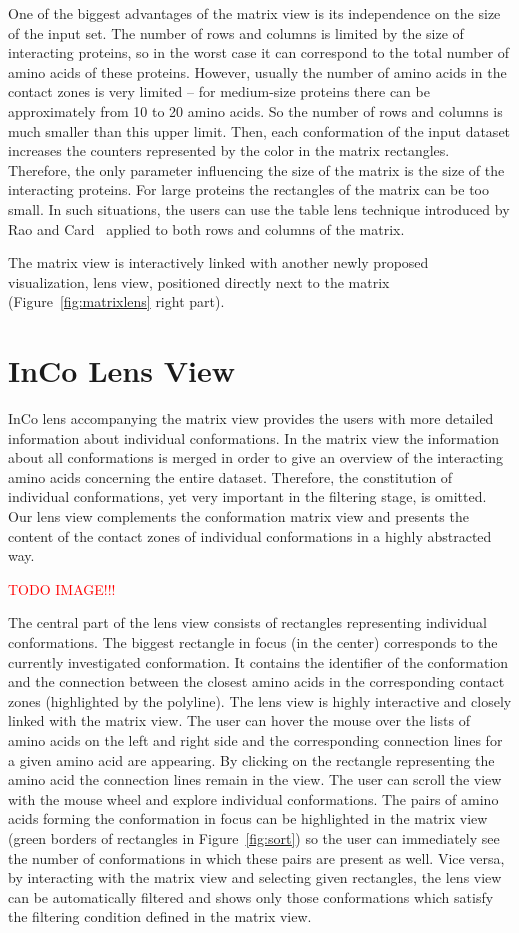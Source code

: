 \documentclass[journal]{vgtc}                %
\begin{document}
One of the biggest advantages of the matrix view is its independence on the size of the input set.
The number of rows and columns is limited by the size of interacting proteins, so in the worst case it can correspond to the total number of amino acids of these proteins.
However, usually the number of amino acids in the contact zones is very limited -- for medium-size proteins there can be approximately from 10 to 20 amino acids.
So the number of rows and columns is much smaller than this upper limit.
Then, each conformation of the input dataset increases the counters represented by the color in the matrix rectangles.
Therefore, the only parameter influencing the size of the matrix is the size of the interacting proteins.
For large proteins the rectangles of the matrix can be too small.
In such situations, the users can use the table lens technique introduced by Rao and Card~\cite{Rao1994} applied to both rows and columns of the matrix.

The matrix view is interactively linked with another newly proposed visualization, lens view, positioned directly next to the matrix (Figure~\ref{fig:matrixlens} right part). 

\section{InCo Lens View}
InCo lens accompanying the matrix view provides the users with more detailed information about individual conformations.
In the matrix view the information about all conformations is merged in order to give an overview of the interacting amino acids concerning the entire dataset.
Therefore, the constitution of individual conformations, yet very important in the filtering stage, is omitted.
Our lens view complements the conformation matrix view and presents the content of the contact zones of individual conformations in a highly abstracted way.

\textcolor{red}{TODO IMAGE!!!}

The central part of the lens view consists of rectangles representing individual conformations. 
The biggest rectangle in focus (in the center) corresponds to the currently investigated conformation. 
It contains the identifier of the conformation and the connection between the closest amino acids in the corresponding contact zones (highlighted by the polyline).
The lens view is highly interactive and closely linked with the matrix view.
The user can hover the mouse over the lists of amino acids on the left and right side and the corresponding connection lines for a given amino acid are appearing.
By clicking on the rectangle representing the amino acid the connection lines remain in the view.
The user can scroll the view with the mouse wheel and explore individual conformations.
The pairs of amino acids forming the conformation in focus can be highlighted in the matrix view (green borders of rectangles in Figure~\ref{fig:sort}) so the user can immediately see the number of conformations in which these pairs are present as well.
Vice versa, by interacting with the matrix view and selecting given rectangles, the lens view can be automatically filtered and shows only those conformations which satisfy the filtering condition defined in the matrix view.
\end{document}
